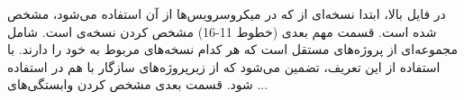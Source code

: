 \documentclass[a4paper,12pt]{book}
\begin{document}
	در فایل  بالا،‌ ابتدا نسخه‌ای از   که در میکروسرویس‌ها از آن  استفاده می‌شود، مشخص شده است.  قسمت مهم بعدی  (خطوط 11-16) مشخص کردن نسخه‌ی  است.  شامل مجموعه‌ای از پروژه‌های مستقل است که هر کدام نسخه‌های مربوط به خود را دارند. با استفاده از این تعریف، تضمین می‌شود که از زیرپروژه‌های سازگار با هم در  استفاده شود. قسمت بعدی مشخص کردن وابستگی‌های ...
		
		
		
		
		
	
	
\end{document}
